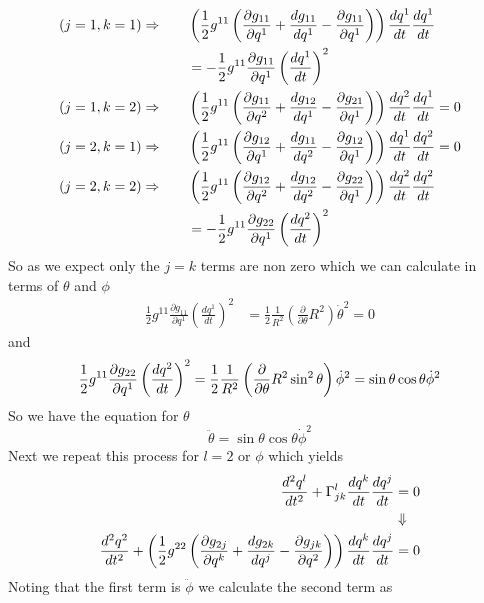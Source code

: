 \documentclass[11pt]{article}
\numberwithin{equation}{section}
\begin{document}
\begin{enumerate}[(a)]
\begin{align*}
(j=1,k=1)\Rightarrow\qquad &\left(\frac{1}{2}g^{11}\left(\frac{\partial g_{11}}{\partial q^1} + \frac{dg_{11}}{dq^{1}} - \frac{\partial{g_{11}}}{\partial{q^1}}\right)\right)\frac{dq^{1}}{dt}\frac{dq^1}{dt}\\
&= -\frac{1}{2}g^{11}\frac{\partial g_{11}}{\partial q^1}\left(\frac{dq^{1}}{dt}\right)^2\\
(j=1,k=2)\Rightarrow\qquad &\left(\frac{1}{2}g^{11}\left(\frac{\partial g_{11}}{\partial q^2} + \frac{dg_{12}}{dq^{1}} - \frac{\partial{g_{21}}}{\partial{q^1}}\right)\right)\frac{dq^{2}}{dt}\frac{dq^1}{dt}= 0\\
(j=2,k=1)\Rightarrow\qquad &\left(\frac{1}{2}g^{11}\left(\frac{\partial g_{12}}{\partial q^1} + \frac{dg_{11}}{dq^{2}} - \frac{\partial{g_{12}}}{\partial{q^1}}\right)\right)\frac{dq^{1}}{dt}\frac{dq^2}{dt}= 0\\
(j=2,k=2)\Rightarrow\qquad &\left(\frac{1}{2}g^{11}\left(\frac{\partial g_{12}}{\partial q^2} + \frac{dg_{12}}{dq^{2}} - \frac{\partial{g_{22}}}{\partial{q^1}}\right)\right)\frac{dq^{2}}{dt}\frac{dq^2}{dt}\\
&= -\frac{1}{2}g^{11}\frac{\partial{g_{22}}}{\partial{q^1}}\left(\frac{dq^{2}}{dt}\right)^2
\end{align*}
So as we expect only the $j=k$ terms are non zero which we can calculate in terms of $\theta$
and $\phi$
\begin{align*}
\frac{1}{2}g^{11}\frac{\partial g_{11}}{\partial q^1}\left(\frac{dq^{1}}{dt}\right)^2 &= \frac{1}{2}\frac{1}{R^2}\left(\frac{\partial}{\partial\theta}R^2\right)\dot{\theta}^2 = 0
\end{align*}
and
\begin{align*}
\frac{1}{2}g^{11}\frac{\partial{g_{22}}}{\partial{q^1}}\left(\frac{dq^{2}}{dt}\right)^2 = \frac{1}{2}\frac{1}{R^2}\left(\frac{\partial{}}{\partial{\theta}}R^2\sin^2\theta\right)\dot{\phi}^2 = \sin\theta\cos\theta\dot\phi^2
\end{align*}
So we have the equation for $\theta$
$$\ddot{\theta} = \sin\theta\cos\theta\dot\phi^2$$
Next we repeat this process for $l=2$ or $\phi$ which yields
\begin{align*}
\frac{d^2q^l}{dt^2} + \Gamma^{l}_{jk}\frac{dq^{k}}{dt}\frac{dq^j}{dt} &= 0\\
&\Downarrow\\
\frac{d^2q^2}{dt^2} + \left(\frac{1}{2}g^{22}\left(\frac{\partial g_{2j}}{\partial q^k} + \frac{dg_{2k}}{dq^{j}} - \frac{\partial{g_{jk}}}{\partial{q^2}}\right)\right)\frac{dq^{k}}{dt}\frac{dq^j}{dt} &= 0
\end{align*}
Noting that the first term is $\ddot\phi$ we calculate the second term as
\begin{align*}

\end{align*}
\end{enumerate}
\end{document}
